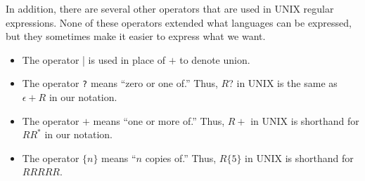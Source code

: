 \documentclass[]{article}
\begin{document}
    In addition, there are several other operators that are used in UNIX
    regular expressions. None of these operators extended what languages can
    be expressed, but they sometimes make it easier to express what we want.
      \begin{itemize}
        \item The operator | is used in place of $+$ to denote union.
        \item The operator \texttt{?} means ``zero or one of.'' Thus, $R$? in
        UNIX is the same as $\epsilon + R$ in our notation.
        \item The operator $+$ means ``one or more of.'' Thus, $R+$ in UNIX is
        shorthand for $RR^*$ in our notation.
        \item The operator $\{ n \}$ means ``$n$ copies of.'' Thus, $R\{5\}$ in
        UNIX is shorthand for $RRRRR$.
      \end{itemize}
\end{document}
